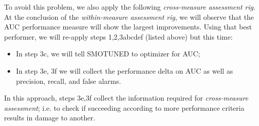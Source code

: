 \documentclass[10pt,conference]{IEEEtran}
\newcommand{\bi}{\begin{itemize}[leftmargin=0.4cm]}
\newcommand{\ei}{\end{itemize}}
\theoremstyle{break}
\theoremstyle{break}
\begin{document}
To avoid this problem, we also apply the following {\em cross-measure assessment rig}.
At the conclusion of the {\em within-measure assessment rig}, we will observe  that the AUC performance measure will show the largest improvements. Using that best performer, we will re-apply steps 1,2,3abcdef (listed above) but this time:
\bi
\item In step 3c, we will tell SMOTUNED to optimizer for AUC;
\item In step 3e, 3f we will collect the performance delta on AUC as well as precision, recall,
and false alarms.
\ei
In this approach, steps 3e,3f collect the information required  for {\em cross-measure assessment};
i.e. to check if succeeding according to more performance criteria results in damage to another.



\newcommand\fnote[1]{\captionsetup{font=small}\caption*{#1}}
\end{document}

